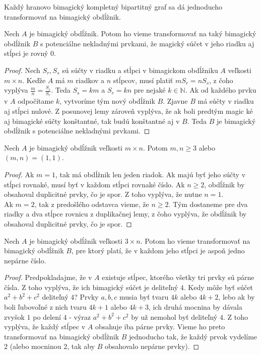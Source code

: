 Každý hranovo bimagický kompletný bipartitný graf sa dá jednoducho transformovať na bimagický obdĺžnik. \\

\begin{subtheorem} Nech $A$ je bimagický obdĺžnik. Potom ho vieme transformovať na taký bimagický obdĺžnik $B$ s potenciálne nekladnými prvkami, že magický súčet v jeho riadku aj stĺpci je rovný $0$.
\end{subtheorem}

\begin{proof} Nech $S_r, S_s$ sú súčty v riadku a stĺpci v bimagickom obdĺžniku $A$ veľkosti $m \times n$. Keďže $A$ má $m$ riadkov a $n$ stĺpcov, musí platiť $m S_r = n S_s$, z čoho vyplýva $\frac{m}{n} = \frac{S_s}{S_r}$. Teda $S_s = km$ a $S_r = kn$ pre nejaké $k \in \mathbb{N}$. Ak od každého prvku v $A$ odpočítame $k$, vytvoríme tým nový obdĺžnik $B$. Zjavne $B$ má súčty v riadku aj stĺpci nulové. Z posunovej lemy zároveň vyplýva, že ak boli predtým magic ké aj bimagické súčty konštantné, tak budú konštantné aj v $B$. Teda $B$ je bimagický obdĺžnik s potenciálne nekladnými prvkami.
\end{proof} 

\begin{subtheorem} Nech $A$ je bimagický obdĺžnik veľkosti $m \times n$. Potom $m,n \geq 3$ alebo $(m, n) = (1, 1)$.
\end{subtheorem}

\begin{proof} Ak $m = 1$, tak má obdĺžnik len jeden riadok. Ak majú byť jeho súčty v stĺpci rovnaké, musí byť v každom stĺpci rovnaké číslo. Ak $n \geq 2$, obdĺžnik by obsahoval duplicitné prvky, čo je spor. Z toho vyplýva, že nutne $n = 1$. \\

Ak $m = 2$, tak z predošlého odstavca vieme, že $n \geq 2$. Tým dostaneme pre dva riadky a dva stĺpce rovnicu z duplikačnej lemy, z čoho vyplýva, že obdĺžnik by obsahoval duplicitné prvky, čo je spor.
\end{proof}

\begin{subtheorem} Nech $A$ je bimagický obdĺžnik veľkosti $3 \times n$. Potom ho vieme transformovať na bimagický obdĺžnik $B$, pre ktorý platí, že v každom jeho stĺpci je aspoň jedno nepárne číslo.
\end{subtheorem}

\begin{proof} Predpokladajme, že v $A$ existuje stĺpec, ktorého všetky tri prvky sú párne čísla. Z toho vyplýva, že ich bimagický súčet je deliteľný $4$. Kedy môže byť súčet $a^2 + b^2 + c^2$ deliteľný $4$? Prvky $a,b,c$ musia byť tvaru $4k$ alebo $4k+2$, lebo ak by boli ľubovoľné z nich tvaru $4k+1$ alebo $4k+3$, ich druhá mocnina by dávala zvyšok $1$ po delení $4$ - výraz $a^2 + b^2 + c^2$ by už nemohol byť deliteľný $4$. Z toho vyplýva, že každý stĺpec v $A$ obsahuje iba párne prvky. Vieme ho preto transformovať na bimagický obdĺžnik $B$ jednoducho tak, že každý prvok vydelíme $2$ (alebo mocninou $2$, tak aby $B$ obsahovalo nepárne prvky).
\end{proof}



